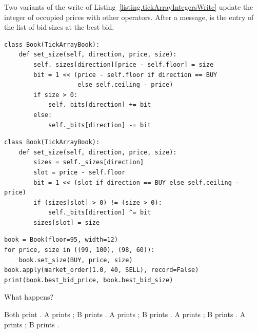 \begin{question}
\label{question.occupancyWrittenByAddition}
Two variants of the write of Listing~\ref{listing.tickArrayIntegersWrite}
update the integer of occupied prices with other operators.
After a message,
 is the entry of the list of bid sizes at the best bid.
\begin{lstlisting}[caption={Alternative A}, label=listing.occupancyByAdditionA]
class Book(TickArrayBook):
    def set_size(self, direction, price, size):
        self._sizes[direction][price - self.floor] = size
        bit = 1 << (price - self.floor if direction == BUY
                    else self.ceiling - price)
        if size > 0:
            self._bits[direction] += bit
        else:
            self._bits[direction] -= bit
\end{lstlisting}
\begin{lstlisting}[caption={Alternative B}, label=listing.occupancyByAdditionB]
class Book(TickArrayBook):
    def set_size(self, direction, price, size):
        sizes = self._sizes[direction]
        slot = price - self.floor
        bit = 1 << (slot if direction == BUY else self.ceiling - price)
        if (sizes[slot] > 0) != (size > 0):
            self._bits[direction] ^= bit
        sizes[slot] = size
\end{lstlisting}
\begin{lstlisting}[caption={Run once with each alternative}, label=listing.occupancyByAdditionRun]
book = Book(floor=95, width=12)
for price, size in ((99, 100), (98, 60)):
    book.set_size(BUY, price, size)
book.apply(market_order(1.0, 40, SELL), record=False)
print(book.best_bid_price, book.best_bid_size)
\end{lstlisting}
What happens?
\begin{choices}
 \choice Both print .
 \choice A prints ; B prints .
 \choice A prints ; B prints .
 \correctchoice A prints ; B prints .
 \choice A prints ; B prints .
\end{choices}
\end{question}

